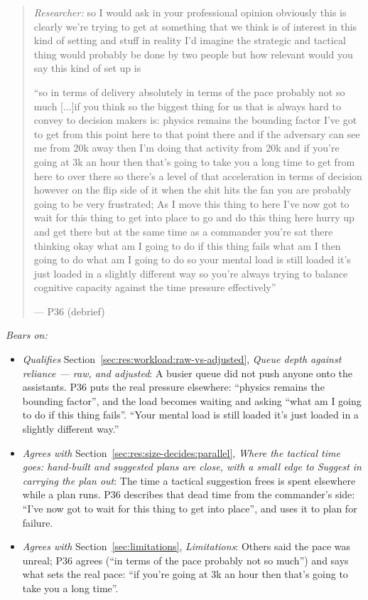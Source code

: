 \begin{quote}\small
{\footnotesize\textit{Researcher:} so I would ask in your professional opinion obviously this is clearly we're trying to get at something that we think is of interest in this kind of setting and stuff in reality I'd imagine the strategic and tactical thing would probably be done by two people but how relevant would you say this kind of set up is}\par\smallskip
``so in terms of delivery absolutely in terms of the pace probably not so much [...]if you think so the biggest thing for us that is always hard to convey to decision makers is: physics remains the bounding factor I've got to get from this point here to that point there and if the adversary can see me from 20k away then I'm doing that activity from 20k and if you're going at 3k an hour then that's going to take you a long time to get from here to over there so there's a level of that acceleration in terms of decision however on the flip side of it when the shit hits the fan you are probably going to be very frustrated; As I move this thing to here I've now got to wait for this thing to get into place to go and do this thing here hurry up and get there but at the same time as a commander you're sat there thinking okay what am I going to do if this thing fails what am I then going to do what am I going to do so your mental load is still loaded it's just loaded in a slightly different way so you're always trying to balance cognitive capacity against the time pressure effectively''\par\hfill--- P36 (debrief)
\end{quote}

\noindent\textit{Bears on:}
\begin{itemize}[leftmargin=1.2em,itemsep=1pt]\small
\item \textit{Qualifies} Section~\ref{sec:res:workload:raw-vs-adjusted}, \emph{Queue depth against reliance --- raw, and adjusted}: A busier queue did not push anyone onto the assistants. P36 puts the real pressure elsewhere: ``physics remains the bounding factor'', and the load becomes waiting and asking ``what am I going to do if this thing fails''. ``Your mental load is still loaded it's just loaded in a slightly different way.''
\item \textit{Agrees with} Section~\ref{sec:res:size-decides:parallel}, \emph{Where the tactical time goes: hand-built and suggested plans are close, with a small edge to Suggest in carrying the plan out}: The time a tactical suggestion frees is spent elsewhere while a plan runs. P36 describes that dead time from the commander's side: ``I've now got to wait for this thing to get into place'', and uses it to plan for failure.
\item \textit{Agrees with} Section~\ref{sec:limitations}, \emph{Limitations}: Others said the pace was unreal; P36 agrees (``in terms of the pace probably not so much'') and says what sets the real pace: ``if you're going at 3k an hour then that's going to take you a long time''.
\end{itemize}


